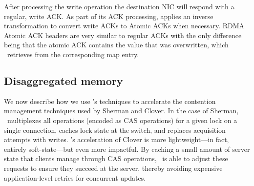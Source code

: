 
After processing the write operation the destination NIC will respond
with a regular, write ACK. As part of its ACK processing, {\sword}
applies an inverse transformation to convert write ACKs to Atomic ACKs
when necessary.  RDMA Atomic ACK headers are very similar to regular
ACKs with the only difference being that the atomic ACK contains the
value that was overwritten, which \sword\ retrieves from the
corresponding map entry.


\subsection{Disaggregated memory}

We now describe how we use \sword's techniques to accelerate the
contention management techniques used by Sherman and Clover.
In the case of Sherman, \sword\ multiplexes all operations (encoded as
CAS operations) for a given lock on a single connection, caches lock
state at the switch, and replaces acquisition attempts with writes.
%
%
\sword's acceleration of Clover is more lightweight---in fact,
entirely soft-state---but even more impactful.  By caching a small
amount of server state that clients manage through CAS operations,
\sword\ is able to adjust these requests to ensure they succeed at the
server, thereby avoiding expensive application-level retries for
concurrent updates.

